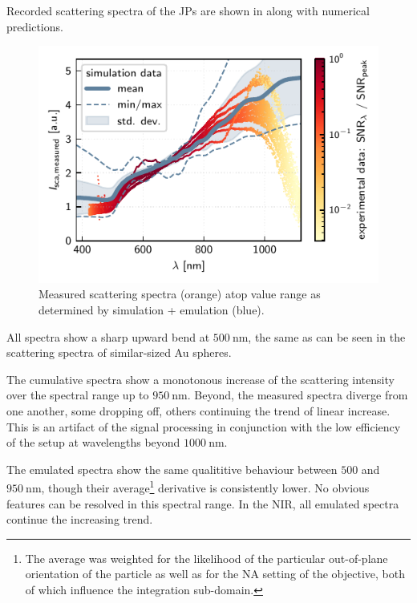 \documentclass[10pt]{article}
\newcommand{\reffig}[2]{\mbox{\sffamily{Figure \ref{#1}#2}}}
\begin{document}
Recorded scattering spectra of the JPs are shown in \reffig{fig:spectra-measured}, along with numerical predictions. 

\begin{figure}[h]
    \centering
    \includegraphics{[fig] spectra (measured).PDF}
    \caption{Measured scattering spectra (orange) atop value range as determined by simulation + emulation (blue).}
    \label{fig:spectra-measured}
\end{figure}


All spectra show a sharp upward bend at $\SI{500}{\nano\meter}$, the same as can be seen in the scattering spectra of similar-sized Au spheres. 

The cumulative spectra show a monotonous increase of the scattering intensity over the spectral range up to $\SI{950}{\nano\meter}$. 
Beyond, the measured spectra diverge from one another, some dropping off, others continuing the trend of linear increase.  
This is an artifact of the signal processing in conjunction with the low efficiency of the setup at wavelengths beyond $\SI{1000}{\nano\meter}$. 


The emulated spectra show the same qualititive behaviour between $500$ and $\SI{950}{\nano\meter}$, though their average\footnote{The average was weighted for the likelihood of the particular out-of-plane orientation of the particle as well as for the NA setting of the objective, both of which influence the integration sub-domain.} derivative is consistently  lower. 
No obvious features can be resolved in this spectral range. 
In the NIR, all emulated spectra continue the increasing trend.
 
\end{document}
